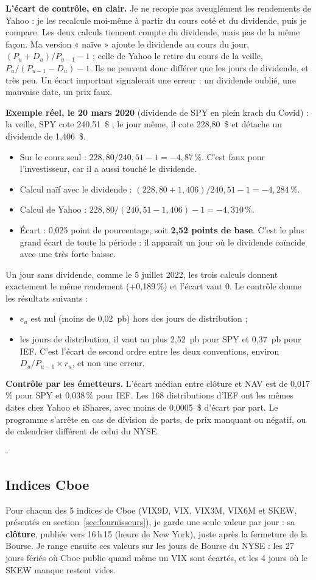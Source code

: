 \documentclass[10pt,a4paper]{article}
\makeatletter
\newcommand{\besoin}[1]{\par\penalty-100\begingroup\setlength{\dimen@}{#1}%
  \dimen@ii\pagegoal\advance\dimen@ii-\pagetotal
  \ifdim\dimen@>\dimen@ii\ifdim\dimen@ii>\z@\vfil\fi\break\fi\endgroup}
\let\soussectionorigine\subsection
\renewcommand{\subsection}{\besoin{5\baselineskip}\soussectionorigine}
\makeatother
\begin{document}
\textbf{L'écart de contrôle, en clair.} Je ne recopie pas aveuglément les rendements de Yahoo : je les recalcule moi-même à partir du cours coté et du dividende, puis je compare. Les deux calculs tiennent compte du dividende, mais pas de la même façon. Ma version « naïve » ajoute le dividende au cours du jour, $(P_u+D_u)/P_{u-1}-1$ ; celle de Yahoo le retire du cours de la veille, $P_u/(P_{u-1}-D_u)-1$. Ils ne peuvent donc différer que les jours de dividende, et très peu. Un écart important signalerait une erreur : un dividende oublié, une mauvaise date, un prix faux.

\textbf{Exemple réel, le 20 mars 2020} (dividende de SPY en plein krach du Covid) : la veille, SPY cote 240,51~\$ ; le jour même, il cote 228,80~\$ et détache un dividende de 1,406~\$.
\begin{itemize}
\item Sur le cours seul : $228{,}80/240{,}51-1=-4{,}87\,\%$. C'est faux pour l'investisseur, car il a aussi touché le dividende.
\item Calcul naïf avec le dividende : $(228{,}80+1{,}406)/240{,}51-1=-4{,}284\,\%$.
\item Calcul de Yahoo : $228{,}80/(240{,}51-1{,}406)-1=-4{,}310\,\%$.
\item Écart : 0,025 point de pourcentage, soit \textbf{2,52 points de base}. C'est le plus grand écart de toute la période : il apparaît un jour où le dividende coïncide avec une très forte baisse.
\end{itemize}
Un jour sans dividende, comme le 5 juillet 2022, les trois calculs donnent exactement le même rendement (+0,189\,\%) et l'écart vaut 0. Le contrôle donne les résultats suivants :
\begin{itemize}
\item $e_u$ est nul (moins de 0,02~pb) hors des jours de distribution ;
\item les jours de distribution, il vaut au plus 2,52~pb pour SPY et 0,37~pb pour IEF. C'est l'écart de second ordre entre les deux conventions, environ $D_u/P_{u-1}\times r_u$, et non une erreur.
\end{itemize}
\textbf{Contrôle par les émetteurs.} L'écart médian entre clôture et NAV est de 0,017\,\% pour SPY et 0,038\,\% pour IEF. Les 168 distributions d'IEF ont les mêmes dates chez Yahoo et iShares, avec moins de 0,0005~\$ d'écart par part. Le programme s'arrête en cas de division de parts, de prix manquant ou négatif, ou de calendrier différent de celui du NYSE.

\subsection{Indices Cboe}
Pour chacun des 5 indices de Cboe (VIX9D, VIX, VIX3M, VIX6M et SKEW, présentés en section~\ref{sec:fournisseurs}), je garde une seule valeur par jour : sa \textbf{clôture}, publiée vers 16\,h\,15 (heure de New York), juste après la fermeture de la Bourse. Je range ensuite ces valeurs sur les jours de Bourse du NYSE : les 27 jours fériés où Cboe publie quand même un VIX sont écartés, et les 4 jours où le SKEW manque restent vides.
\end{document}
